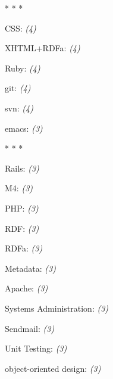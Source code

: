 \documentclass[]{article}
\begin{document}
 \begin{center}* * * \end{center}
 CSS: \emph{(4)}
  \label{css4}

       

 XHTML+RDFa: \emph{(4)}
  \label{xhtml+rdfa4}

       

 Ruby: \emph{(4)}
  \label{ruby4}

       

 git: \emph{(4)}
  \label{git4}

       

 svn: \emph{(4)}
  \label{svn4}

       

 emacs: \emph{(3)}
  \label{emacs3}

       

 \begin{center}* * * \end{center}
 Rails: \emph{(3)}
  \label{rails3}

       

 M4: \emph{(3)}
  \label{m43}

       

 PHP: \emph{(3)}
  \label{php3}

       

 RDF: \emph{(3)}
  \label{rdf3}

       

 RDFa: \emph{(3)}
  \label{rdfa3}

       

 Metadata: \emph{(3)}
  \label{metadata3}

       

 Apache: \emph{(3)}
  \label{apache3}

       

 Systems Administration: \emph{(3)}
  \label{systemsadministration3}

       

 Sendmail: \emph{(3)}
  \label{sendmail3}

       

 Unit Testing: \emph{(3)}
  \label{unittesting3}

       

 object-oriented design: \emph{(3)}
  \label{object-orienteddesign3}
\end{document}
